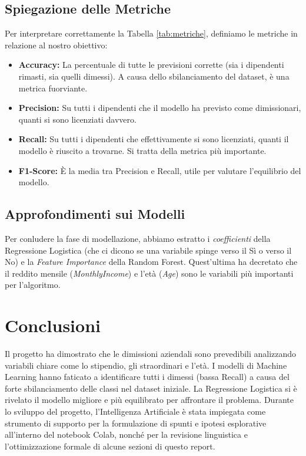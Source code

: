 \documentclass[11pt, a4paper]{article}
\begin{document}
\subsection{Spiegazione delle Metriche}
Per interpretare correttamente la Tabella \ref{tab:metriche}, definiamo le metriche in relazione al nostro obiettivo:
\begin{itemize}
    \item \textbf{Accuracy:} La percentuale di tutte le previsioni corrette (sia i dipendenti rimasti, sia quelli dimessi). A causa dello sbilanciamento del dataset, è una metrica fuorviante.
    \item \textbf{Precision:} Su tutti i dipendenti che il modello ha previsto come dimissionari, quanti si sono licenziati davvero.
    \item \textbf{Recall:} Su tutti i dipendenti che effettivamente si sono licenziati, quanti il modello è riuscito a trovarne. Si tratta della metrica più importante.
    \item \textbf{F1-Score:} È la media tra Precision e Recall, utile per valutare l'equilibrio del modello.
\end{itemize}

\subsection{Approfondimenti sui Modelli}
Per conludere la fase di modellazione, abbiamo estratto i \textit{coefficienti} della Regressione Logistica (che ci dicono se una variabile spinge verso il Sì o verso il No) e la \textit{Feature Importance} della Random Forest. Quest'ultima ha decretato che il reddito mensile (\textit{MonthlyIncome}) e l'età (\textit{Age}) sono le variabili più importanti per l'algoritmo.

\section{Conclusioni}
Il progetto ha dimostrato che le dimissioni aziendali sono prevedibili analizzando variabili chiare come lo stipendio, gli straordinari e l'età. 
I modelli di Machine Learning hanno faticato a identificare tutti i dimessi (bassa Recall) a causa del forte sbilanciamento delle classi nel dataset iniziale. La Regressione Logistica si è rivelato il modello migliore e più equilibrato per affrontare il problema. 
Durante lo sviluppo del progetto, l'Intelligenza Artificiale è stata impiegata come strumento di supporto per la formulazione di spunti e ipotesi esplorative all'interno del notebook Colab, nonché per la revisione linguistica e l'ottimizzazione formale di alcune sezioni di questo report.
\end{document}
